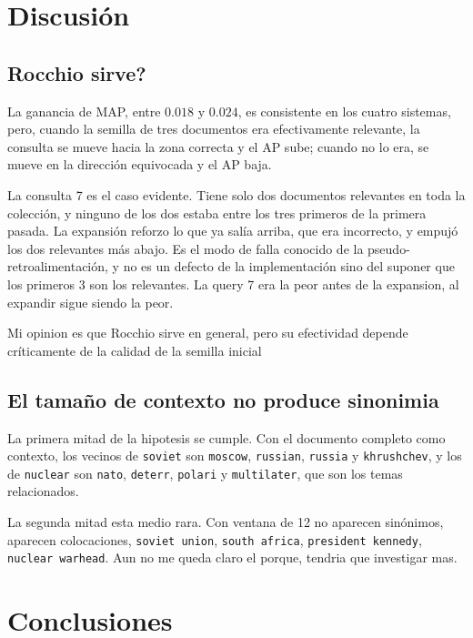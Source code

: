 \documentclass[11pt,letterpaper]{article}
\begin{document}
\section{Discusión}

\subsection*{Rocchio sirve?}

La ganancia de MAP, entre $0.018$ y $0.024$, es consistente en los
cuatro sistemas, pero, cuando la semilla de tres documentos era
efectivamente relevante, la consulta se mueve hacia la zona correcta y
el AP sube; cuando no lo era, se mueve en la dirección equivocada y el
AP baja.

La consulta 7 es el caso evidente. Tiene solo dos documentos relevantes en
toda la colección, y ninguno de los dos estaba entre los tres primeros
de la primera pasada. La expansión reforzo lo que ya salía arriba, que
era incorrecto, y empujó los dos relevantes más abajo. Es el modo de
falla conocido de la pseudo-retroalimentación, y no es un defecto de
la implementación sino del suponer que los primeros 3 son los relevantes.
La query 7 era la peor antes de la expansion, al expandir sigue siendo la peor.

Mi opinion es que Rocchio sirve en general, pero su efectividad depende 
críticamente de la calidad de la semilla inicial


\subsection*{El tamaño de contexto no produce sinonimia}

La primera mitad de la hipotesis se cumple. Con el
documento completo como contexto, los vecinos de \texttt{soviet} son
\texttt{moscow}, \texttt{russian}, \texttt{russia} y
\texttt{khrushchev}, y los de \texttt{nuclear} son \texttt{nato},
\texttt{deterr}, \texttt{polari} y \texttt{multilater}, que son
los temas relacionados.

La segunda mitad esta medio rara. Con ventana de 12 no aparecen
sinónimos, aparecen colocaciones, \texttt{soviet union},
\texttt{south africa}, \texttt{president kennedy},
\texttt{nuclear warhead}. Aun no me queda claro el porque, tendria
que investigar mas.


\section{Conclusiones}
\end{document}
